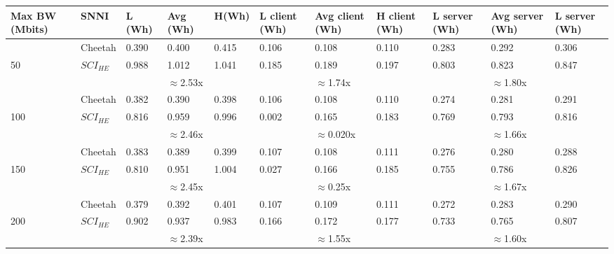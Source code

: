 \begin{tabular}{lllllllllll}
Max BW (Mbits) & SNNI    & L (Wh) & Avg (Wh) & H(Wh) & L client (Wh) & Avg client (Wh) & H client (Wh) & L server (Wh) & Avg server (Wh) & L server (Wh) \\ \hline
               & Cheetah & 0.390  & 0.400    & 0.415 & 0.106         & 0.108           & 0.110         & 0.283         & 0.292           & 0.306         \\
50             & $SCI_{HE}$ & 0.988  & 1.012    & 1.041 & 0.185         & 0.189           & 0.197         & 0.803         & 0.823           & 0.847         \\ \cline{3-11} 
               &         &        & $\approx$2.53x    &       &               & $\approx$1.74x           &               &               & $\approx$1.80x           &               \\ \hline
               & Cheetah & 0.382  & 0.390    & 0.398 & 0.106         & 0.108           & 0.110         & 0.274         & 0.281           & 0.291         \\
100            & $SCI_{HE}$ & 0.816  & 0.959    & 0.996 & 0.002         & 0.165           & 0.183         & 0.769         & 0.793           & 0.816         \\ \cline{3-11} 
               &         &        & $\approx$2.46x    &       &               & $\approx$0.020x           &               &               & $\approx$1.66x           &               \\ \hline
               & Cheetah & 0.383  & 0.389    & 0.399 & 0.107         & 0.108           & 0.111         & 0.276         & 0.280           & 0.288         \\
150            & $SCI_{HE}$ & 0.810  & 0.951    & 1.004 & 0.027         & 0.166           & 0.185         & 0.755         & 0.786           & 0.826         \\ \cline{3-11} 
               &         &        & $\approx$2.45x    &       &               & $\approx$0.25x           &               &               & $\approx$1.67x           &               \\ \hline
               & Cheetah & 0.379  & 0.392    & 0.401 & 0.107         & 0.109           & 0.111         & 0.272         & 0.283           & 0.290         \\
200            & $SCI_{HE}$ & 0.902  & 0.937    & 0.983 & 0.166         & 0.172           & 0.177         & 0.733         & 0.765           & 0.807         \\ \cline{3-11} 
               &         &        & $\approx$2.39x    &       &               & $\approx$1.55x           &               &               & $\approx$1.60x           &               \\ \hline

\end{tabular}
